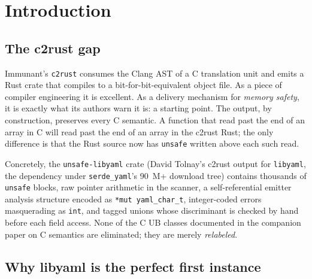 \documentclass[12pt]{article}
\theoremstyle{definition}
\theoremstyle{remark}
\begin{document}
\tableofcontents
\newpage

\section{Introduction}
\label{sec:intro}

\subsection{The c2rust gap}

Immunant's \texttt{c2rust} \cite{immunant2025} consumes the Clang AST of a
C translation unit and emits a Rust crate that compiles to a
bit-for-bit-equivalent object file. As a piece of compiler engineering it
is excellent. As a delivery mechanism for \emph{memory safety}, it is
exactly what its authors warn it is: a starting point. The output, by
construction, preserves every C semantic. A function that read past the
end of an array in C will read past the end of an array in the c2rust
Rust; the only difference is that the Rust source now has \texttt{unsafe}
written above each such read.

Concretely, the \texttt{unsafe-libyaml} crate (David Tolnay's c2rust
output for \texttt{libyaml}, the dependency under
\texttt{serde\_yaml}'s 90~M+ download tree)
contains thousands of \texttt{unsafe} blocks, raw pointer arithmetic in
the scanner, a self-referential emitter analysis structure encoded as
\texttt{*mut yaml\_char\_t}, integer-coded errors masquerading as
\texttt{int}, and tagged unions whose discriminant is checked by hand
before each field access. None of the C UB classes documented in the
companion paper on C semantics are eliminated; they are merely
\emph{relabeled}.

\subsection{Why libyaml is the perfect first instance}
\end{document}
